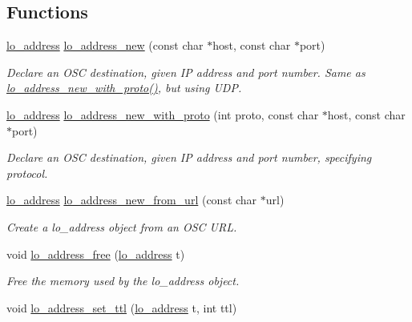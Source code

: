 \subsection*{\-Functions}
\begin{DoxyCompactItemize}
\item 
\hyperlink{lo__types_8h_abf9b53223467de596b89e1377b0f3f3d}{lo\-\_\-address} \hyperlink{group__liblo_gae5af61a02ab08871d3ea070c8f770cfe}{lo\-\_\-address\-\_\-new} (const char $\ast$host, const char $\ast$port)
\begin{DoxyCompactList}\small\item\em \-Declare an \-O\-S\-C destination, given \-I\-P address and port number. \-Same as \hyperlink{group__liblo_gaceb4b068bc48c2b075e790910cab3075}{lo\-\_\-address\-\_\-new\-\_\-with\-\_\-proto()}, but using \-U\-D\-P. \end{DoxyCompactList}\item 
\hyperlink{lo__types_8h_abf9b53223467de596b89e1377b0f3f3d}{lo\-\_\-address} \hyperlink{group__liblo_gaceb4b068bc48c2b075e790910cab3075}{lo\-\_\-address\-\_\-new\-\_\-with\-\_\-proto} (int proto, const char $\ast$host, const char $\ast$port)
\begin{DoxyCompactList}\small\item\em \-Declare an \-O\-S\-C destination, given \-I\-P address and port number, specifying protocol. \end{DoxyCompactList}\item 
\hyperlink{lo__types_8h_abf9b53223467de596b89e1377b0f3f3d}{lo\-\_\-address} \hyperlink{group__liblo_ga1af2cb3c80393cba838f64dfcdc35620}{lo\-\_\-address\-\_\-new\-\_\-from\-\_\-url} (const char $\ast$url)
\begin{DoxyCompactList}\small\item\em \-Create a lo\-\_\-address object from an \-O\-S\-C \-U\-R\-L. \end{DoxyCompactList}\item 
void \hyperlink{group__liblo_ga82b9a2d1d30214114eb5298f43aebac5}{lo\-\_\-address\-\_\-free} (\hyperlink{lo__types_8h_abf9b53223467de596b89e1377b0f3f3d}{lo\-\_\-address} t)
\begin{DoxyCompactList}\small\item\em \-Free the memory used by the lo\-\_\-address object. \end{DoxyCompactList}\item 
void \hyperlink{group__liblo_gacd72097b92411db148844d89071fd281}{lo\-\_\-address\-\_\-set\-\_\-ttl} (\hyperlink{lo__types_8h_abf9b53223467de596b89e1377b0f3f3d}{lo\-\_\-address} t, int ttl)

\end{DoxyCompactItemize}
